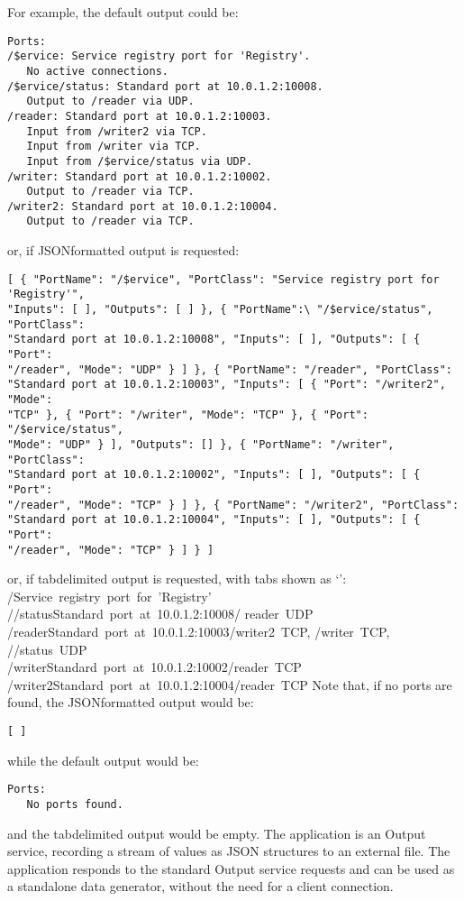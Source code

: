 For example, the default output could be:
\outputBegin{}
\begin{verbatim}
Ports:
/$ervice: Service registry port for 'Registry'.
   No active connections.
/$ervice/status: Standard port at 10.0.1.2:10008.
   Output to /reader via UDP.
/reader: Standard port at 10.0.1.2:10003.
   Input from /writer2 via TCP.
   Input from /writer via TCP.
   Input from /$ervice/status via UDP.
/writer: Standard port at 10.0.1.2:10002.
   Output to /reader via TCP.
/writer2: Standard port at 10.0.1.2:10004.
   Output to /reader via TCP.
\end{verbatim}
\outputEnd{}
or, if JSON\longDash{}formatted output is requested:
\outputBegin{}
\begin{verbatim}
[ { "PortName": "/$ervice", "PortClass": "Service registry port for 'Registry'",
"Inputs": [ ], "Outputs": [ ] }, { "PortName":\ "/$ervice/status", "PortClass":
"Standard port at 10.0.1.2:10008", "Inputs": [ ], "Outputs": [ { "Port":
"/reader", "Mode": "UDP" } ] }, { "PortName": "/reader", "PortClass":
"Standard port at 10.0.1.2:10003", "Inputs": [ { "Port": "/writer2", "Mode":
"TCP" }, { "Port": "/writer", "Mode": "TCP" }, { "Port": "/$ervice/status",
"Mode": "UDP" } ], "Outputs": [] }, { "PortName": "/writer", "PortClass":
"Standard port at 10.0.1.2:10002", "Inputs": [ ], "Outputs": [ { "Port":
"/reader", "Mode": "TCP" } ] }, { "PortName": "/writer2", "PortClass":
"Standard port at 10.0.1.2:10004", "Inputs": [ ], "Outputs": [ { "Port":
"/reader", "Mode": "TCP" } ] } ]
\end{verbatim}
\outputEnd{}
or, if tab\longDash{}delimited output is requested, with tabs shown as `\tabSymbol':
\outputBegin{}
/\dollarService\pseudotab{}Service~registry~port~for~'Registry'\\		
/\dollarService/status\pseudotab{}Standard~port~at~10.0.1.2:10008\pseudotab/%
reader~UDP\\
/reader\pseudotab{}Standard~port~at~10.0.1.2:10003\pseudotab/writer2~TCP,
/writer~TCP,\\
\hspace*{2em}/\dollarService/status~UDP\\
/writer\pseudotab{}Standard~port~at~10.0.1.2:10002\pseudotab/reader~TCP\\
/writer2\pseudotab{}Standard~port~at~10.0.1.2:10004\pseudotab/reader~TCP
\outputEnd{}
Note that, if no ports are found, the JSON\longDash{}formatted output would be:
\outputBegin{}
\begin{verbatim}
[ ]
\end{verbatim}
\outputEnd{}
while the default output would be:
\outputBegin{}
\begin{verbatim}
Ports:
   No ports found.
\end{verbatim}
\outputEnd{}
and the tab\longDash{}delimited output would be empty.
The  application is an Output
service, recording a stream of \yarp{} values as JSON structures to an external file.
The application responds to the standard Output service requests and can be used as a
standalone data generator, without the need for a client connection.\\

